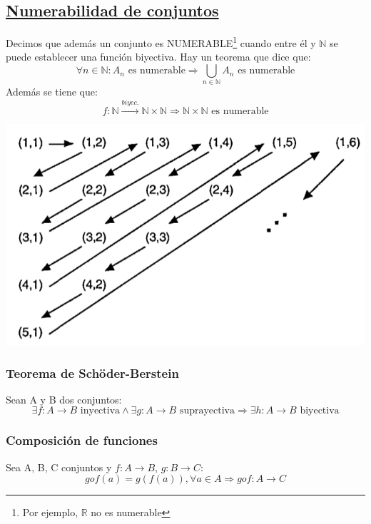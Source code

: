 \documentclass[10pt,a4paper,openright]{book}
\begin{document}
\subsection*{\underline{Numerabilidad de conjuntos}}
Decimos que además un conjunto es NUMERABLE\footnote{Por ejemplo, $\mathbb R$ no es numerable} cuando entre él y $\mathbb N$ se puede establecer una función biyectiva. Hay un teorema que dice que:
$$\forall n\in \mathbb N : A_n\mbox{ es numerable}\Rightarrow \bigcup_{n\in \mathbb N} A_n\mbox{ es numerable}$$
Además se tiene que:
$$f:\mathbb N\stackrel{biyec.}{\rightarrow} \mathbb N \times \mathbb N \Rightarrow \mathbb N \times \mathbb N\mbox{ es numerable}$$
\begin{center}
\includegraphics[scale=0.25]{nxn numerable}
\end{center}

\subsubsection*{Teorema de Schöder-Berstein}
Sean A y B dos conjuntos:
$$\exists f: A\rightarrow B \mbox{ inyectiva}\wedge \exists g: A\rightarrow B \mbox{ suprayectiva}\Rightarrow \exists h: A\rightarrow B \mbox{ biyectiva}$$

\subsubsection*{Composición de funciones}
Sea A, B, C conjuntos y $f: A\rightarrow B$, $g: B\rightarrow C$:
$$gof(a)=g\left(f(a)\right),\forall a \in A\Rightarrow gof: A\rightarrow C$$
\end{document}

